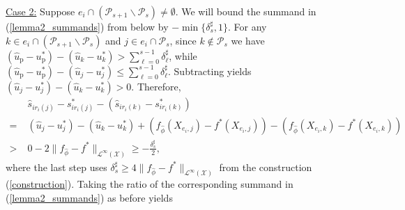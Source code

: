 \documentclass[
  12pt]{article}
\begin{document}
\underline{Case 2:} Suppose $e_i \cap\left(\mathcal{P}_{s+1} \backslash \mathcal{P}_{s}\right) \neq \emptyset$. We will bound the summand in (\ref{lemma2_summands}) from below by $-\min \{\delta^\sharp_s, 1 \}$. For any $k \in e_i \cap\left(\mathcal{P}_{s+1} \backslash \mathcal{P}_{s}\right)$ and $j \in e_i \cap \mathcal{P}_{s}$, since $k \notin \mathcal{P}_s$ we have $(\widehat{u}_\mathrm{p}-u_\mathrm{p}^*)-(\widehat{u}_k-u_k^*) > \sum_{\ell=0}^{s-1}\delta^\sharp_\ell$, while $(\widehat{u}_\mathrm{p}-u_\mathrm{p}^*)-(\widehat{u}_j-u_j^*) \leq \sum_{\ell=0}^{s-1}\delta^\sharp_\ell$. Subtracting yields $(\widehat{u}_j-u_j^*)-(\widehat{u}_k-u_k^*) > 0$. Therefore,
\begin{align}
&\widehat{s}_{i r_i(j)}-s_{i r_i(j)}^*-\left(\widehat{s}_{i r_i(k)}-s_{i r_i(k)}^*\right) \nonumber\\
=\;&(\widehat{u}_j-u_j^*)-(\widehat{u}_k-u_k^*)+(f_{\widehat{\phi}}(X_{e_i, j})-f^*(X_{e_i, j}))-(f_{\widehat{\phi}}(X_{e_i, k})-f^*(X_{e_i, k}))\nonumber\\
>\;& 0-2 \|f_{\widehat{\phi}}-f^*\|_{\mathcal{L}^\infty(\mathcal{X})} \geq -\frac{\delta^\sharp_s}{2}, \label{lemma2_score_bound_case2}
\end{align}
\noindent where the last step uses $\delta^\sharp_s \geq 4\|f_{\widehat{\phi}}-f^*\|_{\mathcal{L}^\infty(\mathcal{X})}$ from the construction (\ref{construction}). Taking the ratio of the corresponding summand in (\ref{lemma2_summands}) as before yields
\end{document}
